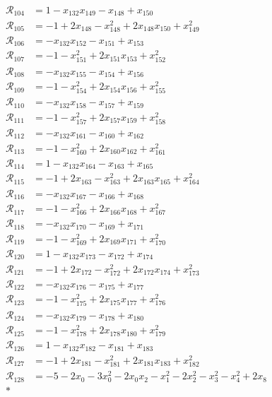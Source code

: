 \begin{align*}
\mathcal R_{104} &= 1 -x_{132}x_{149} -x_{148} +x_{150} \\
\mathcal R_{105} &= -1 +2x_{148} -x_{148}^{2} +2x_{148}x_{150} +x_{149}^{2} \\
\mathcal R_{106} &= -x_{132}x_{152} -x_{151} +x_{153} \\
\mathcal R_{107} &= -1 -x_{151}^{2} +2x_{151}x_{153} +x_{152}^{2} \\
\mathcal R_{108} &= -x_{132}x_{155} -x_{154} +x_{156} \\
\mathcal R_{109} &= -1 -x_{154}^{2} +2x_{154}x_{156} +x_{155}^{2} \\
\mathcal R_{110} &= -x_{132}x_{158} -x_{157} +x_{159} \\
\mathcal R_{111} &= -1 -x_{157}^{2} +2x_{157}x_{159} +x_{158}^{2} \\
\mathcal R_{112} &= -x_{132}x_{161} -x_{160} +x_{162} \\
\mathcal R_{113} &= -1 -x_{160}^{2} +2x_{160}x_{162} +x_{161}^{2} \\
\mathcal R_{114} &= 1 -x_{132}x_{164} -x_{163} +x_{165} \\
\mathcal R_{115} &= -1 +2x_{163} -x_{163}^{2} +2x_{163}x_{165} +x_{164}^{2} \\
\mathcal R_{116} &= -x_{132}x_{167} -x_{166} +x_{168} \\
\mathcal R_{117} &= -1 -x_{166}^{2} +2x_{166}x_{168} +x_{167}^{2} \\
\mathcal R_{118} &= -x_{132}x_{170} -x_{169} +x_{171} \\
\mathcal R_{119} &= -1 -x_{169}^{2} +2x_{169}x_{171} +x_{170}^{2} \\
\mathcal R_{120} &= 1 -x_{132}x_{173} -x_{172} +x_{174} \\
\mathcal R_{121} &= -1 +2x_{172} -x_{172}^{2} +2x_{172}x_{174} +x_{173}^{2} \\
\mathcal R_{122} &= -x_{132}x_{176} -x_{175} +x_{177} \\
\mathcal R_{123} &= -1 -x_{175}^{2} +2x_{175}x_{177} +x_{176}^{2} \\
\mathcal R_{124} &= -x_{132}x_{179} -x_{178} +x_{180} \\
\mathcal R_{125} &= -1 -x_{178}^{2} +2x_{178}x_{180} +x_{179}^{2} \\
\mathcal R_{126} &= 1 -x_{132}x_{182} -x_{181} +x_{183} \\
\mathcal R_{127} &= -1 +2x_{181} -x_{181}^{2} +2x_{181}x_{183} +x_{182}^{2} \\
\mathcal R_{128} &= -5 -2x_{0} -3x_{0}^{2} -2x_{0}x_{2} -x_{1}^{2} -2x_{2}^{2} -x_{3}^{2} -x_{4}^{2} +2x_{8} \\*

\end{align*}
